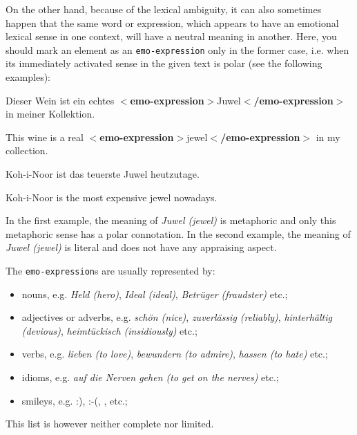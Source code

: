 \documentclass[11pt,a4paper]{article}
\newcommand{\xmltag}[1]{{\textbf{\small$<$#1$>$}}}
\newcommand{\emoexpression}[1]{\xmltag{emo-expression}#1\xmltag{/emo-expression}}
\newenvironment{myexe}{
  \begin{exe}
    \ex\begin{center}
    \itshape
}{
    \end{center}
  \end{exe}
}
\begin{document}
On the other hand, because of the lexical ambiguity, it can also sometimes
happen that the same word or expression, which appears to have an
emotional lexical sense in one context, will have a neutral meaning in
another.  Here, you should mark an element as an \texttt{emo-expression} only
in the former case, i.e. when its immediately activated sense in the given
text is polar (see the following examples):
\begin{myexe}
  Dieser Wein ist ein echtes \emoexpression{Juwel} in meiner Kollektion.

  This wine is a real \emoexpression{jewel} in my collection.
\end{myexe}
\begin{myexe}
  Koh-i-Noor ist das teuerste Juwel heutzutage.

  Koh-i-Noor is the most expensive jewel nowadays.
\end{myexe}
In the first example, the meaning of \textit{Juwel (jewel)} is metaphoric and
only this metaphoric sense has a polar connotation.  In the second example, the
meaning of \textit{Juwel (jewel)} is literal and does not have any appraising
aspect.

The \texttt{emo-expression}s are usually represented by:
\begin{itemize}
  \item nouns, e.g. \textit{Held (hero)}, \textit{Ideal (ideal)},
    \textit{Betr\"uger (fraudster)} etc.;

  \item adjectives or adverbs, e.g. \textit{sch\"on (nice)},
    \textit{zuverl\"assig (reliably)}, \textit{hinterh\"altig
      (devious)}, \textit{heimt\"uckisch (insidiously)} etc.;

  \item verbs, e.g. \textit{lieben (to love)}, \textit{bewundern (to
    admire)}, \textit{hassen (to hate)} etc.;

  \item idioms, e.g. \textit{auf die Nerven gehen (to get on the
    nerves)} etc.;

  \item smileys, e.g. :), :-(, \smiley{}, \frownie{} etc.;
\end{itemize}
This list is however neither complete nor limited.
\end{document}
